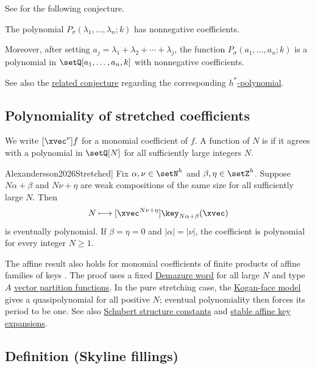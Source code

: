 See \cite{AlexanderssonAlhajjar2018} for the following conjecture.
\begin{conjecture}
\label{keyEhrhartConjecture}
The polynomial $P_{\sigma}(\lambda_1,\dotsc,\lambda_n;k)$ has nonnegative coefficients.

Moreover, after setting $a_j = \lambda_1+\lambda_2+\dotsb+\lambda_j$, the function
$P_{\sigma}(a_1,\dotsc,a_n;k)$ is a polynomial in $\setQ[a_1,\dotsc,a_n,k]$
with nonnegative coefficients.
\end{conjecture}
See also the \hyperref[keyHStarRealRootedConjecture]{related conjecture}
regarding the corresponding \hyperref[hStarPolynomial]{$h^*$-polynomial}.


\subsection[keyStretchedCoefficients]{Polynomiality of stretched coefficients}

We write $[\xvec^\nu]f$ for a monomial coefficient of $f$.
A function of $N$ is  if it agrees with a
polynomial in $\setQ[N]$ for all sufficiently large integers $N$.

\begin{theorem}[Alexandersson, \cite[Thm.~3.1 and Cor.~3.2]{Alexandersson2026Stretched}]
Fix $\alpha,\nu\in\setN^h$ and $\beta,\eta\in\setZ^h$.
Suppose $N\alpha+\beta$ and $N\nu+\eta$ are weak compositions of the
same size for all sufficiently large $N$. Then
\[
 N\longmapsto [\xvec^{N\nu+\eta}]\key_{N\alpha+\beta}(\xvec)
\]
is eventually polynomial. If $\beta=\eta=0$ and $|\alpha|=|\nu|$,
the coefficient is polynomial for every integer $N\geq1$.
\end{theorem}

The affine result also holds for monomial coefficients of finite products
of affine families of keys \cite[Prop.~3.3]{Alexandersson2026Stretched}.
The proof uses a fixed \hyperref[keyDefinitionOperators]{Demazure word}
for all large $N$ and type $A$
\hyperref[kostantPartitionFunction]{vector partition functions}.
In the pure stretching case, the
\hyperref[keyKogan]{Kogan-face model} gives a quasipolynomial for all
positive $N$; eventual polynomiality then forces its period to be one.
See also \hyperref[schubertStretching]{Schubert structure constants}
and \hyperref[schubertStableKeyExpansion]{stable affine key expansions}.

\subsection[keyDefinitionKeyFillings]{Definition (Skyline fillings)}

